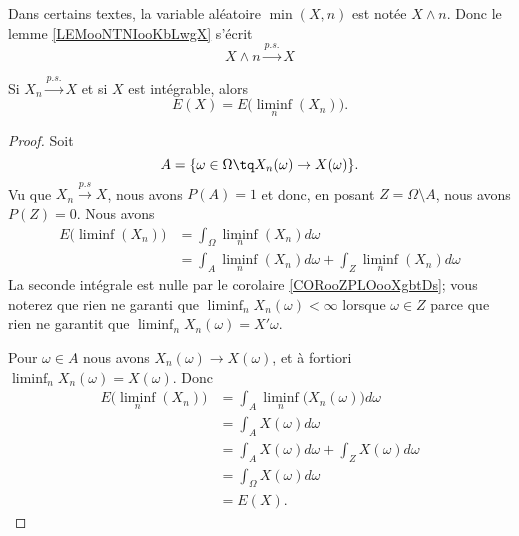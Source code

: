 \begin{normaltext}
	Dans certains textes, la variable aléatoire \( \min(X,n)\) est notée \( X\wedge n\). Donc le lemme \ref{LEMooNTNIooKbLwgX} s'écrit
	\begin{equation}
		X\wedge n\stackrel{p.s.}{\longrightarrow}X
	\end{equation}
\end{normaltext}

\begin{proposition}	\label{PROPooDWTWooPygbmK}
	Si \( X_n\stackrel{ p.s.}{\longrightarrow} X\) et si \( X\) est intégrable, alors
	\begin{equation}
		E(X)=E\big( \liminf_n(X_n) \big).
	\end{equation}
\end{proposition}

\begin{proof}
	Soit
	\begin{equation}
		A=\{ \omega\in\Omega\tq X_n(\omega)\to X(\omega) \}.
	\end{equation}
	Vu que \( X_n\stackrel{ p.s}{\longrightarrow} X\), nous avons \( P(A)=1\) et donc, en posant \( Z=\Omega\setminus A\), nous avons \( P(Z)=0\). Nous avons
	\begin{subequations}
		\begin{align}
			E\big( \liminf(X_n) \big) & =\int_{\Omega}\liminf_n(X_n)d\omega                          \\
			                          & =\int_{A}\liminf_n(X_n)d\omega+\int_{Z}\liminf_n(X_n)d\omega
		\end{align}
	\end{subequations}
	La seconde intégrale est nulle par le corolaire \ref{CORooZPLOooXgbtDs}; vous noterez que rien ne garanti que \( \liminf_n X_n(\omega)<\infty\) lorsque \( \omega\in Z\) parce que rien ne garantit que \( \liminf_nX_n(\omega)=X'\omega\).

	Pour \( \omega\in A\) nous avons \( X_n(\omega)\to X(\omega)\), et à fortiori \( \liminf_n X_n(\omega)=X(\omega)\). Donc
	\begin{subequations}
		\begin{align}
			E\big( \liminf_n(X_n) \big) & =\int_A\liminf_n\big( X_n(\omega) \big)d\omega  \\
			                            & =\int_AX(\omega)d\omega                         \\
			                            & =\int_AX(\omega)d\omega +\int_ZX(\omega)d\omega \\
			                            & =\int_{\Omega}X(\omega)d\omega                  \\
			                            & =E(X).
		\end{align}
	\end{subequations}
\end{proof}

